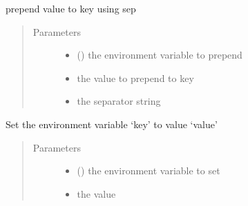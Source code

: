\documentclass[a4paper,10pt,english]{sphinxmanual}
\begin{document}
\begin{fulllineitems}

\begin{fulllineitems}
\label{\detokenize{commands/apidoc/src:src.fileEnviron.FileEnviron.prepend_value}}
prepend value to key using sep
\begin{quote}\begin{description}
\item[{Parameters}] \leavevmode\begin{itemize}
\item {} 
 () \textendash{} the environment variable to prepend

\item {} 
 \textendash{} the value to prepend to key

\item {} 
 \textendash{} the separator string

\end{itemize}

\end{description}\end{quote}

\end{fulllineitems}


\begin{fulllineitems}
\label{\detokenize{commands/apidoc/src:src.fileEnviron.FileEnviron.set}}
Set the environment variable ‘key’ to value ‘value’
\begin{quote}\begin{description}
\item[{Parameters}] \leavevmode\begin{itemize}
\item {} 
 () \textendash{} the environment variable to set

\item {} 
 \textendash{} the value

\end{itemize}

\end{description}\end{quote}

\end{fulllineitems}


\end{fulllineitems}
\end{document}
